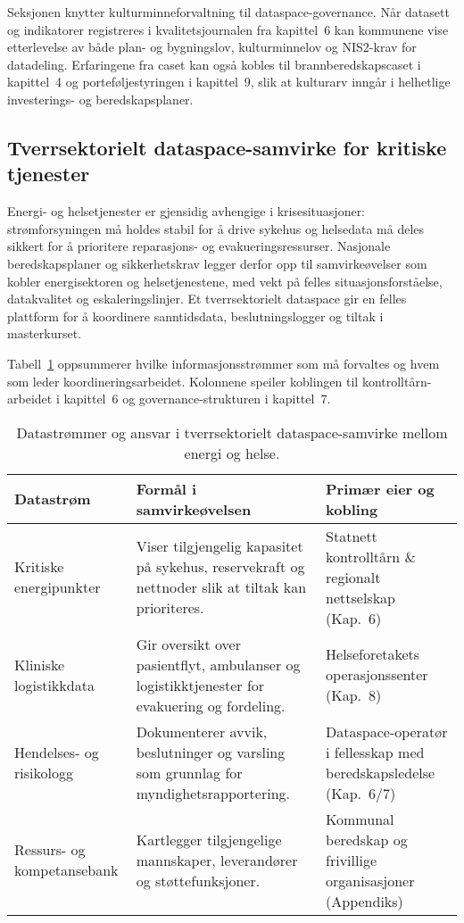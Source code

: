 Seksjonen knytter kulturminneforvaltning til dataspace-governance. Når datasett og indikatorer registreres i kvalitetsjournalen fra kapittel~6 kan kommunene vise etterlevelse av både plan- og bygningslov, kulturminnelov og NIS2-krav for datadeling. Erfaringene fra caset kan også kobles til brannberedskapscaset i kapittel~4 og porteføljestyringen i kapittel~9, slik at kulturarv inngår i helhetlige investerings- og beredskapsplaner.


\subsection{Tverrsektorielt dataspace-samvirke for kritiske tjenester}
Energi- og helsetjenester er gjensidig avhengige i krisesituasjoner: strømforsyningen må holdes stabil for å drive sykehus og
helsedata må deles sikkert for å prioritere reparasjons- og evakueringsressurser. Nasjonale beredskapsplaner og sikkerhetskrav
legger derfor opp til samvirkeøvelser som kobler energisektoren og helsetjenestene, med vekt på felles situasjonsforståelse,
datakvalitet og eskaleringslinjer.\citep{dsb2023totalberedskap,nsm2023grunnprinsipper,nhn2024dataspace,statnett2024kontrolltarn,helsedir2023beredskap}
Et tverrsektorielt dataspace gir en felles plattform for å koordinere sanntidsdata, beslutningslogger og tiltak i masterkurset.

Tabell~\ref{tab:kap03-tversektor-samvirke} oppsummerer hvilke informasjonsstrømmer som må forvaltes og hvem som leder
koordineringsarbeidet. Kolonnene speiler koblingen til kontrolltårn-arbeidet i kapittel~6 og governance-strukturen i
kapittel~7.

\begin{table}[ht]
    \centering
    \caption{Datastrømmer og ansvar i tverrsektorielt dataspace-samvirke mellom energi og helse.}
    \label{tab:kap03-tversektor-samvirke}
    \begin{tabular}{p{}p{}p{}}
        \toprule
        \textbf{Datastrøm} & \textbf{Formål i samvirkeøvelsen} & \textbf{Primær eier og kobling} \\
        \midrule
        Kritiske energipunkter & Viser tilgjengelig kapasitet på sykehus, reservekraft og nettnoder slik at tiltak kan prioriteres. & Statnett kontrolltårn \& regionalt nettselskap (Kap.~6) \\
        Kliniske logistikkdata & Gir oversikt over pasientflyt, ambulanser og logistikktjenester for evakuering og fordeling. & Helseforetakets operasjonssenter (Kap.~8) \\
        Hendelses- og risikologg & Dokumenterer avvik, beslutninger og varsling som grunnlag for myndighetsrapportering. & Dataspace-operatør i fellesskap med beredskapsledelse (Kap.~6/7) \\
        Ressurs- og kompetansebank & Kartlegger tilgjengelige mannskaper, leverandører og støttefunksjoner. & Kommunal beredskap og frivillige organisasjoner (Appendiks) \\
        \bottomrule
    \end{tabular}
\end{table}

